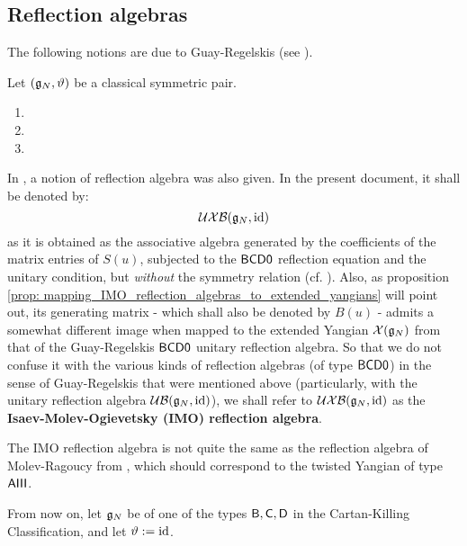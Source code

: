         \subsection{Reflection algebras}
            The following notions are due to Guay-Regelskis (see \cite{guay_regelskis_twisted_yangians_for_symmetric_pairs_of_types_BCD}).
            \begin{definition} \label{def: (extended)_reflection_algebras}
                Let $(\mathfrak{g}_N, \vartheta)$ be a classical symmetric pair. 
                \begin{enumerate}
                    \item 
                    \item 
                    \item 
                \end{enumerate}
            \end{definition}
            \begin{convention} \label{conv: IMO_reflection_algebras}
                In \cite{isaev_molev_fusion_for_brauer_algebras_1}, a notion of reflection algebra was also given. In the present document, it shall be denoted by:
                    $$\mathcal{UXB}(\mathfrak{g}_N, \mathrm{id})$$
                as it is obtained as the associative algebra generated by the coefficients of the matrix entries of $S(u)$, subjected to the $\mathsf{B}\mathsf{C}\mathsf{D}\mathsf{0}$ reflection equation and the unitary condition, but \textit{without} the symmetry relation (cf. \cite[Definition 3.1]{isaev_molev_fusion_for_brauer_algebras_1}). Also, as proposition \ref{prop: mapping_IMO_reflection_algebras_to_extended_yangians} will point out, its generating matrix - which shall also be denoted by $B(u)$ - admits a somewhat different image when mapped to the extended Yangian $\mathcal{X}(\mathfrak{g}_N)$ from that of the Guay-Regelskis $\mathsf{B}\mathsf{C}\mathsf{D}\mathsf{0}$ unitary reflection algebra. So that we do not confuse it with the various kinds of reflection algebras (of type $\mathsf{B}\mathsf{C}\mathsf{D}\mathsf{0}$) in the sense of Guay-Regelskis that were mentioned above (particularly, with the unitary reflection algebra $\mathcal{UB}(\mathfrak{g}_N, \mathrm{id})$), we shall refer to $\mathcal{UXB}(\mathfrak{g}_N, \mathrm{id})$ as the \textbf{Isaev-Molev-Ogievetsky (IMO) reflection algebra}.
            \end{convention}
            \begin{remark}
                The IMO reflection algebra is not quite the same as the reflection algebra of Molev-Ragoucy from \cite{molev_ragoucy_representations_of_reflection_algebras}, which should correspond to the twisted Yangian of type $\mathsf{A} \mathsf{III}$.
            \end{remark}
            From now on, let $\mathfrak{g}_N$ be of one of the types $\mathsf{B}, \mathsf{C}, \mathsf{D}$ in the Cartan-Killing Classification, and let $\vartheta := \mathrm{id}$.

